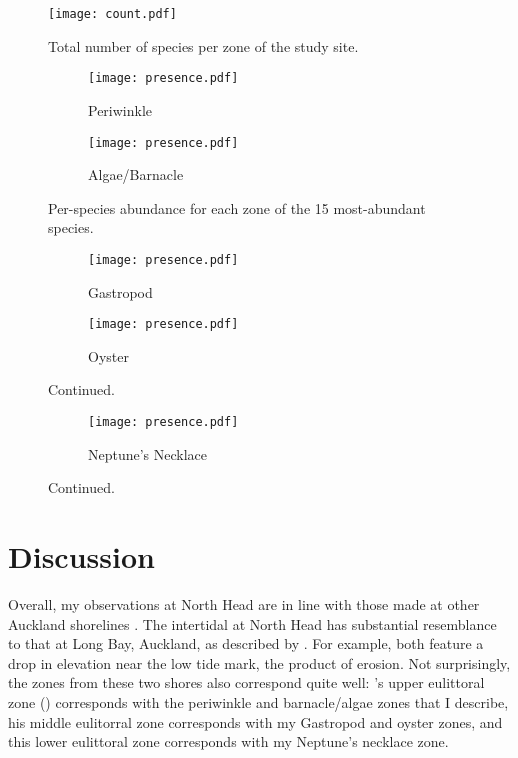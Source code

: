 \documentclass[11pt]{article}
\newcommand{\aposcite}[2]{\citeauthor{#1}'s #2 (\citeyear{#1})}
\begin{document}
	\begin{figure}
		\texttt{[image: count.pdf]}
		\caption{Total number of species per zone of the study site.}
		\label{fig:count}
	\end{figure}
	
	\begin{figure}
		\centering
		\begin{subfigure}{\textwidth}
			\centering
			\texttt{[image: presence.pdf]}
			\caption{Periwinkle}
		\end{subfigure}
		\begin{subfigure}{\textwidth}
			\centering
			\texttt{[image: presence.pdf]}
			\caption{Algae/Barnacle}
		\end{subfigure}
		\caption{Per-species abundance for each zone of the 15 most-abundant species.}
		\label{fig:presence}
	\end{figure}

	\begin{figure}
	  \ContinuedFloat
		\begin{subfigure}{\textwidth}
			\centering
			\texttt{[image: presence.pdf]}
			\caption{Gastropod}
		\end{subfigure}
		\begin{subfigure}{\textwidth}
			\centering
			\texttt{[image: presence.pdf]}
			\caption{Oyster}
		\end{subfigure}
		\caption{Continued.}
	\end{figure}

	\begin{figure}
		\ContinuedFloat
		\begin{subfigure}{\textwidth}
			\centering
			\texttt{[image: presence.pdf]}
			\caption{Neptune's Necklace}
		\end{subfigure}
		\caption{Continued.}
	\end{figure}
	
	\section*{Discussion}
	
	Overall, my observations at North Head are in line with those made at other Auckland shorelines \parencite{Dellow:1950,Morton:2004}. The intertidal at North Head has substantial resemblance to that at Long Bay, Auckland, as described by \textcite{Morton:2004}. For example, both feature a drop in elevation near the low tide mark, the product of erosion. Not surprisingly, the zones from these two shores also correspond quite well: \aposcite{Morton:2004}{upper eulittoral zone} corresponds with the periwinkle and barnacle/algae zones that I describe, his middle eulitorral zone corresponds with my Gastropod and oyster zones, and this lower eulittoral zone corresponds with my Neptune's necklace zone.
	
\end{document}
